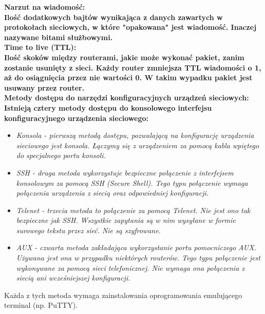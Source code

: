 \documentclass[a4paper,12pt]{article}
\newcommand{\h}[1]{\noindent \bf #1 \rm \\ \noindent}
\newcommand{\italic}[1]{\it #1 \rm}
\begin{document}
\h{Narzut na wiadomość:}
Ilość dodatkowych bajtów wynikająca z danych zawartych w protokołach sieciowych, w które "opakowana" jest wiadomość. Inaczej nazywane bitami służbowymi.\\

\h{Time to live (TTL):}
Ilość skoków między routerami, jakie może wykonać pakiet, zanim zostanie usunięty z sieci. Każdy router zmniejsza TTL wiadomości o 1, aż do osiągnięcia przez nie wartości 0. W takim wypadku pakiet jest usuwany przez router.\\

\h{Metody dostępu do narzędzi konfiguracyjnych urządzeń sieciowych:}
Istnieją cztery metody dostępu do konsolowego interfejsu konfiguracyjnego urządzenia sieciowego:
\begin{itemize}
	\item \italic{Konsola} - pierwszą metodą dostępu, pozwalającą na konfigurację urządzenia sieciowego jest konsola. Łączymy się z urządzeniem za pomocą kabla wpiętego do specjalnego portu konsoli.
	
	\item \italic{SSH} - druga metoda wykorzystuje bezpieczne połączenie z interfejsem konsolowym za pomocą SSH (Secure Shell).	Tego typu połączenie wymaga połączenia urządzenia z siecią oraz odpowiedniej konfiguracji.
	
	\item \italic{Telenet} - trzecia metoda to połączenie za pomocą Telenet. Nie jest ono tak bezpieczne jak SSH. Wszystkie zapytania są w nim wysyłane w formie surowego tekstu przez sieć. Nie są szyfrowane.
	
	\item \italic{AUX} - czwarta metoda zakładająca wykorzystanie portu pomocniczego AUX. Używana jest ona w przypadku niektórych routerów. Tego typu połączenie jest wykonywane za pomocą sieci telefonicznej. Nie wymaga ona połączenia z siecią ani wcześniejszej konfiguracji.
\end{itemize}
\vspace{5mm}

\noindent
Każda z tych metoda wymaga zainstalowania oprogramowania emulującego terminal (np. PuTTY).\\
\end{document}
